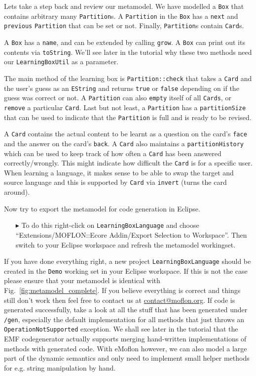 Lets take a step back and review our metamodel.  
We have modelled a \texttt{Box} that contains arbitrary many \texttt{Partition}s.  
A \texttt{Partition} in the \texttt{Box} has a \texttt{next} and \texttt{previous} \texttt{Partition} that can be set or not. Finally, \texttt{Partition}s contain \texttt{Card}s.

A \texttt{Box} has a \texttt{name}, and can be extended by calling \texttt{grow}. 
A \texttt{Box} can print out its contents via \texttt{toString}.  
We'll see later in the tutorial why these two methods need our \texttt{LearningBoxUtil} as a parameter.

The main method of the learning box is \texttt{Partition::check} that takes a \texttt{Card} and the user's guess as an \texttt{EString} and returns \texttt{true} or \texttt{false} depending on if the guess was correct or not.
A \texttt{Partition} can also \texttt{empty} itself of all \texttt{Cards}, or \texttt{remove} a particular \texttt{Card}.  
Last but not least, a \texttt{Partition} has a \texttt{partitionSize} that can be used to indicate that the \texttt{Partition} is full and is ready to be revised.

A \texttt{Card} contains the actual content to be learnt as a question on the card's \texttt{face} and the answer on the card's \texttt{back}. 
A \texttt{Card} also maintains a \texttt{partition\-History} which can be used to keep track of how often a \texttt{Card} has been answered correctly/wrongly.  
This might indicate how difficult the \texttt{Card} is for a specific user.
When learning a language, it makes sense to be able to swap the target and source language and this is supported by \texttt{Card} via \texttt{invert} (turns the card around).

Now try to export the metamodel for code generation in Eclipse.  

\begin{enumerate}
\item[$\blacktriangleright$] To do this right-click on \texttt{LearningBoxLanguage} and choose ``Extensions/MOFLON::Ecore Addin/Export Selection to Workspace''.  
Then switch to your Eclipse work\-space and refresh the metamodel workingset.
\end{enumerate}

If you have done everything right, a new project \texttt{LearningBoxLanguage} should be created in the \texttt{Demo} working set in your Eclipse workspace.
If this is not the case please ensure that your metamodel is identical with Fig.~\ref{fig:metamodel_complete}.  
If you believe everything is correct and things still don't work then feel free to contact us at \href{mailto:contact@moflon.org}{contact@moflon.org}.  
If code is generated successfully, take a look at all the stuff that has been generated under \texttt{/gen}, especially the default  implementation for all methods that just throws an  \texttt{OperationNotSupported} exception.  
We shall see later in the tutorial  that the EMF codegenerator actually supports merging hand-written implementations of methods with generated code.  
With eMoflon however, we can also model a large part of the dynamic semantics and only need to implement small helper methods for e.g. string manipulation by hand.

